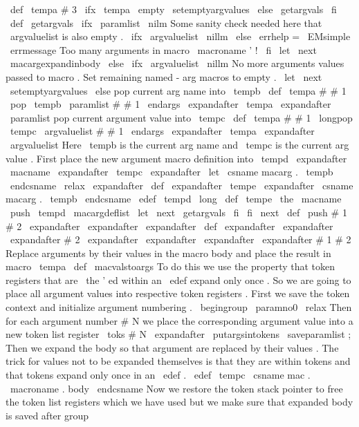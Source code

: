 {{{{{{}
%
\
def
\
tempa
{
#
3
}
%
\
ifx
\
tempa
\
empty
\
setemptyargvalues
\
else
\
getargvals
\
fi
}
%
\
def
\
getargvals
{
%
\
ifx
\
paramlist
\
nilm
%
Some
sanity
check
needed
here
that
\
argvaluelist
is
also
empty
.
\
ifx
\
argvaluelist
\
nillm
\
else
\
errhelp
=
\
EMsimple
\
errmessage
{
Too
many
arguments
in
macro
\
macroname
'
!
}
%
\
fi
\
let
\
next
\
macargexpandinbody
\
else
\
ifx
\
argvaluelist
\
nillm
%
No
more
arguments
values
passed
to
macro
.
Set
remaining
named
-
arg
%
macros
to
empty
.
\
let
\
next
\
setemptyargvalues
\
else
%
pop
current
arg
name
into
\
tempb
\
def
\
tempa
#
#
1
{
\
pop
{
\
tempb
}
{
\
paramlist
}
#
#
1
\
endargs
}
%
\
expandafter
\
tempa
\
expandafter
{
\
paramlist
}
%
%
pop
current
argument
value
into
\
tempc
\
def
\
tempa
#
#
1
{
\
longpop
{
\
tempc
}
{
\
argvaluelist
}
#
#
1
\
endargs
}
%
\
expandafter
\
tempa
\
expandafter
{
\
argvaluelist
}
%
%
Here
\
tempb
is
the
current
arg
name
and
\
tempc
is
the
current
arg
value
.
%
First
place
the
new
argument
macro
definition
into
\
tempd
\
expandafter
\
macname
\
expandafter
{
\
tempc
}
%
\
expandafter
\
let
\
csname
macarg
.
\
tempb
\
endcsname
\
relax
\
expandafter
\
def
\
expandafter
\
tempe
\
expandafter
{
%
\
csname
macarg
.
\
tempb
\
endcsname
}
%
\
edef
\
tempd
{
\
long
\
def
\
tempe
{
\
the
\
macname
}
}
%
\
push
\
tempd
\
macargdeflist
\
let
\
next
\
getargvals
\
fi
\
fi
\
next
}
\
def
\
push
#
1
#
2
{
%
\
expandafter
\
expandafter
\
expandafter
\
def
\
expandafter
\
expandafter
\
expandafter
#
2
%
\
expandafter
\
expandafter
\
expandafter
{
%
\
expandafter
#
1
#
2
}
%
}
%
Replace
arguments
by
their
values
in
the
macro
body
and
place
the
result
%
in
macro
\
tempa
\
def
\
macvalstoargs
{
%
%
To
do
this
we
use
the
property
that
token
registers
that
are
\
the
'
ed
%
within
an
\
edef
expand
only
once
.
So
we
are
going
to
place
all
argument
%
values
into
respective
token
registers
.
%
%
First
we
save
the
token
context
and
initialize
argument
numbering
.
\
begingroup
\
paramno0
\
relax
%
Then
for
each
argument
number
#
N
we
place
the
corresponding
argument
%
value
into
a
new
token
list
register
\
toks
#
N
\
expandafter
\
putargsintokens
\
saveparamlist
;
%
%
Then
we
expand
the
body
so
that
argument
are
replaced
by
their
%
values
.
The
trick
for
values
not
to
be
expanded
themselves
is
that
they
%
are
within
tokens
and
that
tokens
expand
only
once
in
an
\
edef
.
\
edef
\
tempc
{
\
csname
mac
.
\
macroname
.
body
\
endcsname
}
%
%
Now
we
restore
the
token
stack
pointer
to
free
the
token
list
registers
%
which
we
have
used
but
we
make
sure
that
expanded
body
is
saved
after
%
group
}}}}}
